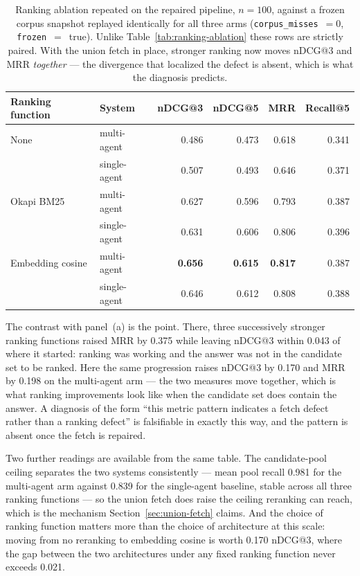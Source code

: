 \documentclass[acmsmall,review,anonymous,screen]{acmart}
\begin{document}
\begin{table}[t]
\caption{Ranking ablation repeated on the repaired pipeline, $n=100$, against a
frozen corpus snapshot replayed identically for all three arms
(\texttt{corpus\_misses}~$=0$, \texttt{frozen}~$=$~true). Unlike
Table~\ref{tab:ranking-ablation} these rows are strictly paired. With the union
fetch in place, stronger ranking now moves nDCG@3 and MRR \emph{together} ---
the divergence that localized the defect is absent, which is what the diagnosis
predicts.}
\label{tab:scaled-ablation}
\begin{tabular}{llrrrr}
\toprule
Ranking function & System & nDCG@3 & nDCG@5 & MRR & Recall@5 \\
\midrule
None            & multi-agent  & 0.486 & 0.473 & 0.618 & 0.341 \\
                & single-agent & 0.507 & 0.493 & 0.646 & 0.371 \\
Okapi BM25      & multi-agent  & 0.627 & 0.596 & 0.793 & 0.387 \\
                & single-agent & 0.631 & 0.606 & 0.806 & 0.396 \\
Embedding cosine & multi-agent  & \textbf{0.656} & \textbf{0.615} & \textbf{0.817} & 0.387 \\
                 & single-agent & 0.646 & 0.612 & 0.808 & 0.388 \\
\bottomrule
\end{tabular}
\end{table}

The contrast with panel~(a) is the point. There, three successively stronger
ranking functions raised MRR by 0.375 while leaving nDCG@3 within 0.043 of where
it started: ranking was working and the answer was not in the candidate set to be
ranked. Here the same progression raises nDCG@3 by 0.170 and MRR by 0.198 on the
multi-agent arm --- the two measures move together, which is what ranking
improvements look like when the candidate set does contain the answer. A
diagnosis of the form ``this metric pattern indicates a fetch defect rather than
a ranking defect'' is falsifiable in exactly this way, and the pattern is absent
once the fetch is repaired.

Two further readings are available from the same table. The candidate-pool
ceiling separates the two systems consistently --- mean pool recall 0.981 for the
multi-agent arm against 0.839 for the single-agent baseline, stable across all
three ranking functions --- so the union fetch does raise the ceiling reranking
can reach, which is the mechanism Section~\ref{sec:union-fetch} claims. And the
choice of ranking function matters more than the choice of architecture at this
scale: moving from no reranking to embedding cosine is worth 0.170 nDCG@3, where
the gap between the two architectures under any fixed ranking function never
exceeds 0.021.
\end{document}
